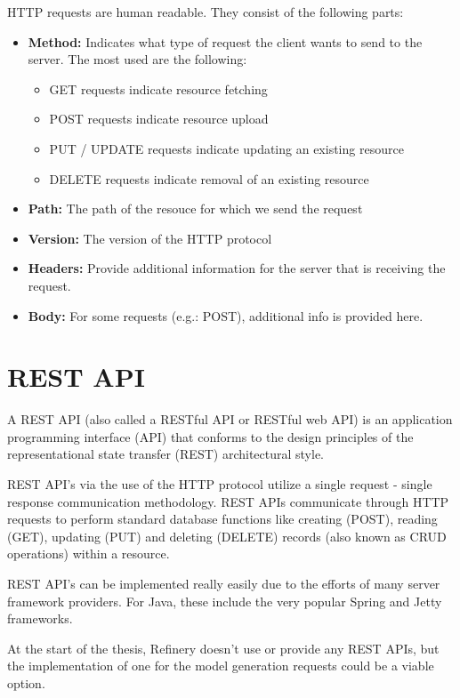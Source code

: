 	HTTP requests are human readable. They consist of the following parts:
	\begin{itemize}
		\item \textbf{Method:} Indicates what type of request the client wants to send to the server. The most used are the following:
		\begin{itemize}
			\item GET requests indicate resource fetching
			\item POST requests indicate resource upload 
			\item PUT / UPDATE requests indicate updating an existing resource
			\item DELETE requests indicate removal of an existing resource
		\end{itemize} 
		\item \textbf{Path:} The path of the resouce for which we send the request 
		\item \textbf{Version:} The version of the HTTP protocol
		\item \textbf{Headers:} Provide additional information for the server that is receiving the request. 
		\item \textbf{Body:} For some requests (e.g.: POST), additional info is provided here.
	\end{itemize}

\section{REST API} \label{backgrrestapi}
	A REST API \cite{restapi} (also called a RESTful API or RESTful web API) is an application programming interface (API) that conforms to the design principles of 
	the representational state transfer (REST) architectural style. 

	REST API's via the use of the HTTP protocol utilize a single request - single response communication methodology.
	REST APIs communicate through HTTP requests to perform standard database functions like creating (POST), reading (GET),
	updating (PUT) and deleting (DELETE) records (also known as CRUD operations) within a resource.

	REST API's can be implemented really easily due to the efforts of many server framework providers. For Java, these include 
	the very popular Spring and Jetty frameworks. 

	At the start of the thesis, Refinery doesn't use or provide any REST APIs, but the implementation of one for the model 
	generation requests could be a viable option.


